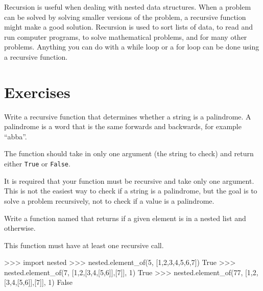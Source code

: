 \documentclass[11pt]{cselabheader}
\begin{document}
Recursion is useful when dealing with nested data structures. When
a problem can be solved by solving smaller versions of the problem, a
recursive function might make a good solution.  Recursion is used to
sort lists of data, to read and run computer programs, to solve
mathematical problems, and for many other problems. Anything you can
do with a while loop or a for loop can be done using a recursive function.

\newpage
\section{Exercises}

\begin{ex}[palindrome.py] Write a recursive function that determines whether a
    string is a palindrome. A palindrome is a word that is the same forwards and
    backwards, for example ``abba''.

    The function should take in only one argument (the string to check) and
    return either \lstinline{True} or \lstinline{False}.

    It is required that your function must be recursive and take only one argument.
    This is not the easiest way to check if a string is a palindrome, but the goal
    is to solve a problem recursively, not to check if a value is a palindrome.
\end{ex}

\begin{ex}[nested.py]
Write a function named  that returns
 if a given element is in a nested list and
 otherwise.

This function must have at least one recursive call.

\begin{pyconcode}
>>> import nested
>>> nested.element_of(5, [1,2,3,4,5,6,7])
True
>>> nested.element_of(7, [1,2,[3,4,[5,6]],[7]], 1)
True
>>> nested.element_of(77, [1,2,[3,4,[5,6]],[7]], 1)
False
\end{pyconcode}
\end{ex}
\end{document}
